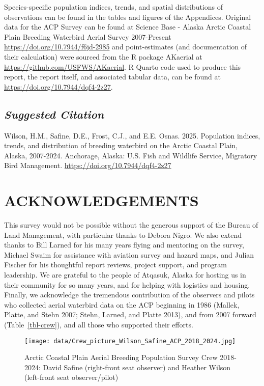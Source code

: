 \documentclass[
]{article}
\begin{document}
Species-specific population indices, trends, and spatial distributions
of observations can be found in the tables and figures of the
Appendices. Original data for the ACP Survey can be found at Science
Base - Alaska Arctic Coastal Plain Breeding Waterbird Aerial Survey
2007-Present \url{https://doi.org/10.7944/f6jd-2985} and point-estimates
(and documentation of their calculation) were sourced from the R package
AKaerial at \url{https://github.com/USFWS/AKaerial}. R Quarto code used
to produce this report, the report itself, and associated tabular data,
can be found at \url{https://doi.org/10.7944/dqf4-2z27}.

\subsection*{\texorpdfstring{\emph{Suggested
Citation}}{Suggested Citation}}\label{suggested-citation}

Wilson, H.M., Safine, D.E., Frost, C.J., and E.E. Osnas. 2025.
Population indices, trends, and distribution of breeding waterbird on
the Arctic Coastal Plain, Alaska, 2007-2024. Anchorage, Alaska: U.S.
Fish and Wildlife Service, Migratory Bird Management.
\url{https://doi.org/10.7944/dqf4-2z27}

\section*{ACKNOWLEDGEMENTS}\label{acknowledgements}

This survey would not be possible without the generous support of the
Bureau of Land Management, with particular thanks to Debora Nigro. We
also extend thanks to Bill Larned for his many years flying and
mentoring on the survey, Michael Swaim for assistance with aviation
survey and hazard maps, and Julian Fischer for his thoughtful report
reviews, project support, and program leadership. We are grateful to the
people of Atqasuk, Alaska for hosting us in their community for so many
years, and for helping with logistics and housing. Finally, we
acknowledge the tremendous contribution of the observers and pilots who
collected aerial waterbird data on the ACP beginning in 1986 (Mallek,
Platte, and Stehn 2007; Stehn, Larned, and Platte 2013), and from 2007
forward (Table~\ref{tbl-crew}), and all those who supported their
efforts.

\begin{figure}[H]

{\centering \texttt{[image: data/Crew\_picture\_Wilson\_Safine\_ACP\_2018\_2024.jpg]}

}

\caption{Arctic Coastal Plain Aerial Breeding Population Survey Crew
2018-2024: David Safine (right-front seat observer) and Heather Wilson
(left-front seat observer/pilot)}

\end{figure}%
\end{document}
